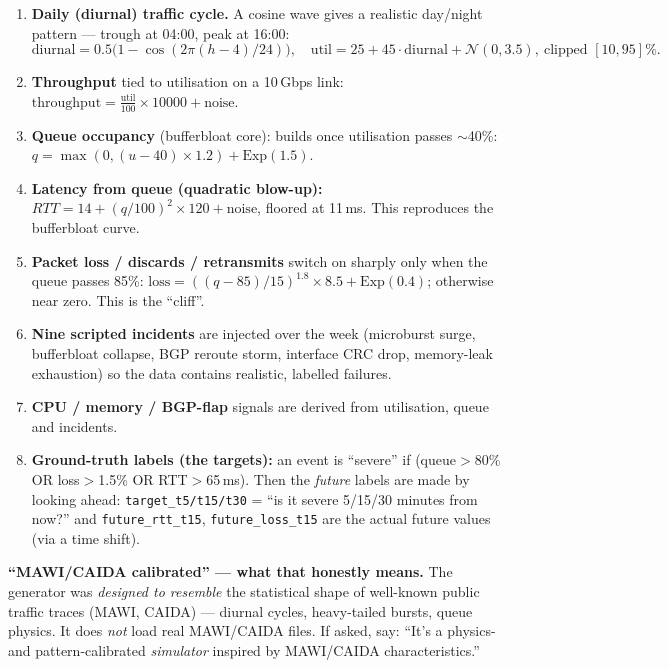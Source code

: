 \documentclass[11pt,a4paper]{article}
\newcommand{\note}[1]{%
  \par\vspace{3pt}\noindent
  \colorbox{soft}{\parbox{\dimexpr\linewidth-2\fboxsep}{\small #1}}%
  \par\vspace{3pt}}
\begin{document}
\begin{enumerate}
  \item \textbf{Daily (diurnal) traffic cycle.} A cosine wave gives a realistic day/night pattern ---
  trough at 04:00, peak at 16:00:
  \[ \text{diurnal}=0.5\big(1-\cos(2\pi(h-4)/24)\big),\quad
     \text{util}=25+45\cdot\text{diurnal}+\mathcal{N}(0,3.5),\ \text{clipped }[10,95]\%. \]
  \item \textbf{Throughput} tied to utilisation on a 10\,Gbps link:
  $\text{throughput}=\tfrac{\text{util}}{100}\times10000+\text{noise}$.
  \item \textbf{Queue occupancy} (bufferbloat core): builds once utilisation passes $\sim$40\%:
  $q=\max(0,(u-40)\times1.2)+\text{Exp}(1.5)$.
  \item \textbf{Latency from queue (quadratic blow-up):}
  $RTT=14+(q/100)^2\times120+\text{noise}$, floored at 11\,ms. This reproduces the bufferbloat curve.
  \item \textbf{Packet loss / discards / retransmits} switch on sharply only when the queue passes 85\%:
  $\text{loss}=((q-85)/15)^{1.8}\times8.5+\text{Exp}(0.4)$; otherwise near zero. This is the ``cliff''.
  \item \textbf{Nine scripted incidents} are injected over the week (microburst surge, bufferbloat collapse,
  BGP reroute storm, interface CRC drop, memory-leak exhaustion) so the data contains realistic, labelled failures.
  \item \textbf{CPU / memory / BGP-flap} signals are derived from utilisation, queue and incidents.
  \item \textbf{Ground-truth labels (the targets):} an event is ``severe'' if
  (queue$>$80\% OR loss$>$1.5\% OR RTT$>$65\,ms). Then the \emph{future} labels are made by looking ahead:
  \texttt{target\_t5/t15/t30} = ``is it severe 5/15/30 minutes from now?'' and
  \texttt{future\_rtt\_t15}, \texttt{future\_loss\_t15} are the actual future values (via a time shift).
\end{enumerate}

\note{\textbf{``MAWI/CAIDA calibrated'' --- what that honestly means.} The generator was \emph{designed to
resemble} the statistical shape of well-known public traffic traces (MAWI, CAIDA) --- diurnal cycles, heavy-tailed
bursts, queue physics. It does \emph{not} load real MAWI/CAIDA files. If asked, say: ``It's a physics- and
pattern-calibrated \emph{simulator} inspired by MAWI/CAIDA characteristics.''}
\end{document}
